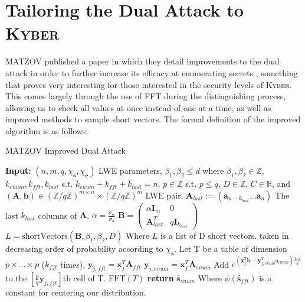 \documentclass[a4paper, 10pt]{article}
\theoremstyle{definition}
\begin{document}
\section{Tailoring the Dual Attack to \textsc{Kyber}}

MATZOV published a paper in which they detail improvements to the dual attack in order to further increase its efficacy at enumerating secrets \cite{matzov_2022_6412487}, something that proves very interesting for those interested in the security levels of \textsc{Kyber}. This comes largely through the use of \ac{FFT} during the distinguishing process, allowing us to check all values at once instead of one at a time, as well as improved methods to sample short vectors. The formal definition of the improved algorithm is as follows:


\begin{algorithm}[H]
    \caption{MATZOV Improved Dual Attack \cite{matzov_2022_6412487}}
    \begin{algorithmic}[1]
    \State \textbf{Input:} $(n,m,q,\chi _{\mathbf{s}}, \chi _{\mathbf{e}})$ LWE parameters, $\beta _1, \beta _2 \leq d$ where $\beta _1, \beta _2 \in \mathbb{Z}$, $k_{enum}, k_{fft}, k_{last}$ s.t. $k_{enum} + k_{fft} + k_{last} = n$, $p \in \mathbb{Z}$ s.t. $p \leq q$, $D \in \mathbb{Z}$, $C \in \mathbb{R}$, and $(\mathbf{A, b})\in (\mathbb{Z}/q\mathbb{Z})^{m \times n} \times (\mathbb{Z}/q\mathbb{Z})^m$ LWE pair.
    \State
    \State $\mathbf{A}_{last} := (\mathbf{a}_{n-k_{last}}...\mathbf{a}_n)$ \Comment The last $k_{last}$ columns of $\mathbf{A}$.
    \State $\alpha = \frac{\sigma _\mathbf{e}}{\sigma _\mathbf{s}}$
    \State $\mathbf{B} = 
        \begin{pmatrix}
            \alpha \mathbf{I}_m & 0\\
            \mathbf{A}^T_{last} & q \mathbf{I}_{k_{last}}
        \end{pmatrix}$
    \State $L = \mbox{shortVectors}(\mathbf{B}, \beta _1, \beta _2, D)$ \Comment Where $L$ is a list of D short vectors.
     \Comment taken in decreasing order of probability according to $\chi _\mathbf{s}$.
        \State Let T be a table of dimension $p \times ... \times p$ ($k_{fft}$ times).
        \State $\mathbf{y}_{j, fft} = \mathbf{x}^T_j \mathbf{A}_{fft}$
        \State $\mathbf{y}_{j, enum} = \mathbf{x}^T_j \mathbf{A}_{enum}$
        \State Add $e^{(\mathbf{x}^T_j\mathbf{b}-\mathbf{y}^T_{j, enum}\bar{\mathbf{s}}_{enum})\frac{2\pi i}{q}}$ to the $\left[\frac{p}{q}\mathbf{y}_{j, fft}\right]$th cell of T.
        \EndFor
    \State $\mbox{FFT}(T)$
        \State \textbf{return} $\bar{\mathbf{s}}_{enum}$ \Comment Where $\psi (\bar{\mathbf{s}}_{fft})$ is a constant for centering our distribution.
    \EndIf
    \EndFor
    
    \end{algorithmic}
\end{algorithm}
\end{document}
